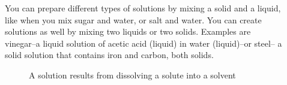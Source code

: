\documentclass[main.tex]{subfiles} %
\begin{document}
\begin{description}
\item[] You can prepare different types of solutions by mixing a solid and a liquid, like when you mix sugar and water, or salt and water. You can create solutions as well by mixing two liquids or two solids. Examples are vinegar--a liquid solution of acetic acid (liquid) in water (liquid)--or steel-- a solid solution that contains iron and carbon, both solids. 
\begin{figure}[h]%

\caption{A solution results from dissolving a solute into a solvent}
\label{fig:electrolytes2}


\end{figure}
\end{description}
\end{document}
